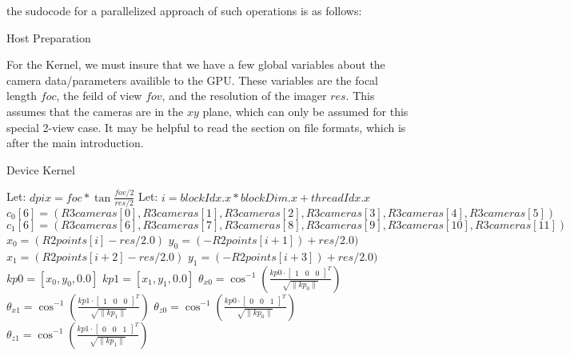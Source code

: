 the sudocode for a parallelized approach of such operations is as follows:

\begin{algorithm}
\caption{Host Preparation}\label{Line Generation Host}
\begin{algorithmic}[1]

  \EndProcedure

\end{algorithmic}
\end{algorithm}


For the Kernel, we must insure that we have a few global variables about the camera data/parameters
availible to the GPU. These variables are the focal length $foc$, the feild of view $fov$, and the
resolution of the imager $res$. This assumes that the cameras are in the $xy$ plane, which can only
be assumed for this special 2-view case. It may be helpful to read the section on file formats, which
is after the main introduction.

\begin{algorithm}
\caption{Device Kernel}\label{Line Generation Device}
\begin{algorithmic}[1]
  \State Let: $dpix = foc * \tan{\frac{fov/2}{res/2}}$
  \State Let: $i = blockIdx.x * blockDim.x + threadIdx.x$
    \State $c_0[6] = (R3cameras[0],R3cameras[1],R3cameras[2],R3cameras[3],R3cameras[4],R3cameras[5])$
    \State $c_1[6] = (R3cameras[6],R3cameras[7],R3cameras[8],R3cameras[9],R3cameras[10],R3cameras[11])$
    \State $x_0 = (R2points[i] - res/2.0)$
    \State $y_0 = (-R2points[i+1]) + res/2.0)$
    \State $x_1 = (R2points[i+2] - res/2.0)$
    \State $y_1 = (-R2points[i+3]) + res/2.0)$
    \State $kp0 = [x_0,y_0,0.0]$
    \State $kp1 = [x_1,y_1,0.0]$
    \State $\theta_{x0} = \cos^{-1}(\frac{kp0 \cdot \begin{bmatrix}1 & 0 & 0\end{bmatrix}^{T}}{\sqrt{\|kp_0\|}})$
    \State $\theta_{x1} = \cos^{-1}(\frac{kp1 \cdot \begin{bmatrix}1 & 0 & 0\end{bmatrix}^{T}}{\sqrt{\|kp_1\|}})$
    \State $\theta_{z0} = \cos^{-1}(\frac{kp0 \cdot \begin{bmatrix}0 & 0 & 1\end{bmatrix}^{T}}{\sqrt{\|kp_0\|}})$
    \State $\theta_{z1} = \cos^{-1}(\frac{kp1 \cdot \begin{bmatrix}0 & 0 & 1\end{bmatrix}^{T}}{\sqrt{\|kp_1\|}})$
  \EndProcedure
\end{algorithmic}
\end{algorithm}

